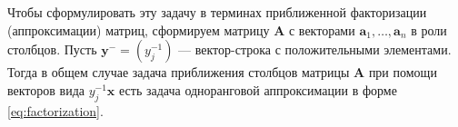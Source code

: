 \documentclass[specialist,
               substylefile = spbu.rtx,
               subf,href,colorlinks=true, 12pt]{disser}
\theoremstyle{definition}
\begin{document}
Чтобы сформулировать эту задачу в терминах приближенной факторизации (аппроксимации) матриц, сформируем матрицу $\bm{A}$ с векторами  $\bm{a}_{1},\ldots,\bm{a}_{n}$ в роли столбцов. Пусть $\bm{y}^{-}=(y_{j}^{-1})$ --- вектор-строка с положительными элементами. Тогда в общем случае задача приближения столбцов матрицы $\bm{A}$ при помощи векторов вида $y_{j}^{-1}\bm{x}$ есть задача одноранговой аппроксимации в форме \eqref{eq:factorization}.

\end{document}
